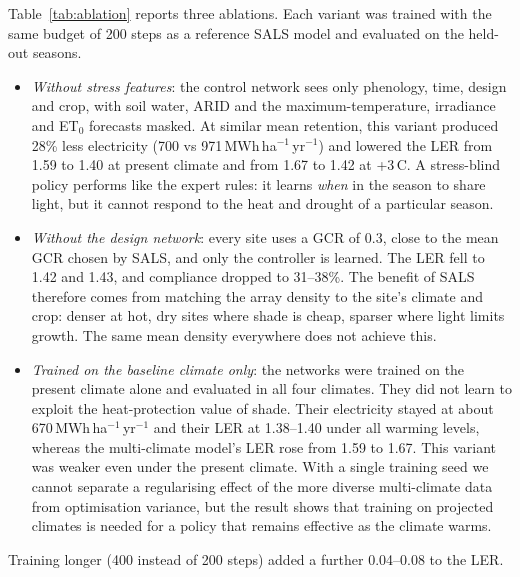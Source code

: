 Table~\ref{tab:ablation} reports three ablations. Each variant was trained with the same budget of 200 steps as a reference SALS model and evaluated on the held-out seasons.

\begin{itemize}
\item \emph{Without stress features}: the control network sees only phenology, time, design and crop, with soil water, ARID and the maximum-temperature, irradiance and ET$_0$ forecasts masked. At similar mean retention, this variant produced 28\% less electricity (700 vs 971\,MWh\,ha$^{-1}$\,yr$^{-1}$) and lowered the LER from 1.59 to 1.40 at present climate and from 1.67 to 1.42 at +3\,\textdegree C. A stress-blind policy performs like the expert rules: it learns \emph{when} in the season to share light, but it cannot respond to the heat and drought of a particular season.
\item \emph{Without the design network}: every site uses a GCR of 0.3, close to the mean GCR chosen by SALS, and only the controller is learned. The LER fell to 1.42 and 1.43, and compliance dropped to 31--38\%. The benefit of SALS therefore comes from matching the array density to the site's climate and crop: denser at hot, dry sites where shade is cheap, sparser where light limits growth. The same mean density everywhere does not achieve this.
\item \emph{Trained on the baseline climate only}: the networks were trained on the present climate alone and evaluated in all four climates. They did not learn to exploit the heat-protection value of shade. Their electricity stayed at about 670\,MWh\,ha$^{-1}$\,yr$^{-1}$ and their LER at 1.38--1.40 under all warming levels, whereas the multi-climate model's LER rose from 1.59 to 1.67. This variant was weaker even under the present climate. With a single training seed we cannot separate a regularising effect of the more diverse multi-climate data from optimisation variance, but the result shows that training on projected climates is needed for a policy that remains effective as the climate warms.
\end{itemize}

Training longer (400 instead of 200 steps) added a further 0.04--0.08 to the LER.

